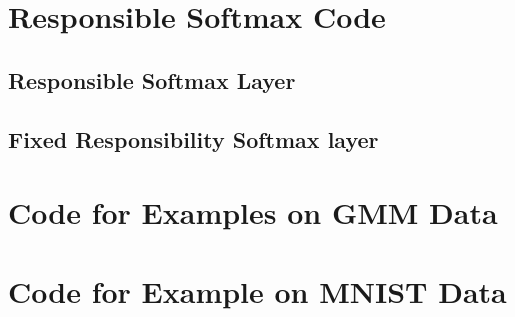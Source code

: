 

\newpage

\newpage


\chapter{Responsible Softmax Code}\label{app:RScode}
\section{Responsible Softmax Layer}\label{code:RSlayer}







\section{Fixed Responsibility Softmax layer}\label{code:fixedRSLayer}



\chapter{Code for Examples on GMM Data}\label{app:GMMexample}






\chapter{Code for Example on MNIST Data}\label{app:MNISTexample}




\begin{verbatim}


\end{verbatim}